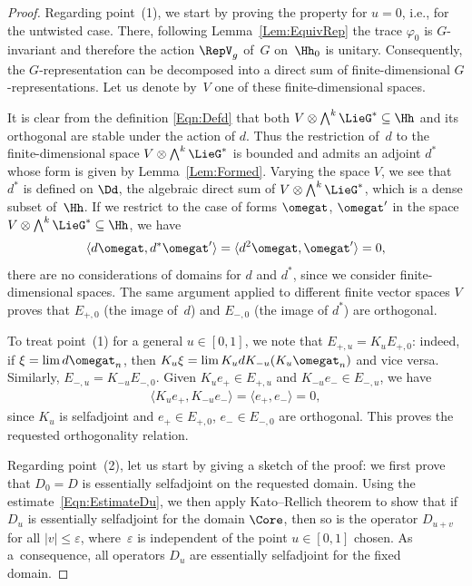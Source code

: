 \begin{proof}
Regarding point~(1), %
we start by proving the property for $u = 0$, i.e., for the untwisted case. There, following Lemma~\ref{Lem:EquivRep} the trace $\varphi_0$ is $G$-invariant and therefore the action $\RepV_g$ of~$G$ on~$\Hh_0$ is unitary. Consequently, the $G$-representation can be decomposed into a direct sum of f\/inite-dimensional $G$-representations. Let us denote by~$V$ one of these f\/inite-dimensional spaces.

It is clear from the def\/inition \eqref{Eqn:Defd} that both $V \otimes \bigwedge^k \LieG^* \subseteq \Hh$ and its orthogonal are stable under the action of $d$. Thus the restriction of~$d$ to the f\/inite-dimensional space $V \otimes \bigwedge^k \LieG^*$ is bounded and admits an adjoint $d^*$ whose form is given by Lemma~\ref{Lem:Formed}. Varying the space $V$, we see that $d^*$ is def\/ined on $\Dd$, the algebraic direct sum of $V \otimes \bigwedge^k \LieG^*$, which is a dense subset of~$\Hh$. If we restrict to the case of forms $\omegat$, $\omegat'$ in the space $V \otimes \bigwedge^k \LieG^* \subseteq \Hh$, we have
\begin{gather*}
\langle d \omegat, d^* \omegat' \rangle = \langle d^2 \omegat, \omegat' \rangle = 0,
\end{gather*}
there are no considerations of domains for $d$ and $d^*$, since we consider f\/inite-dimensional spaces. The same argument applied to dif\/ferent f\/inite vector spaces $V$ proves that $E_{+,0}$ (the image of~$d$) and $E_{-,0}$ (the image of $d^*$) are orthogonal.

To treat point~(1) %
for a general $u \in [0,1]$, we note that $E_{+,u} = K_u E_{+,0}$: indeed, if $\xi = \lim d \omegat_n$, then $K_u \xi = \lim K_u d K_{-u} (K_u \omegat_n)$ and vice versa. Similarly, $E_{-,u} = K_{-u} E_{-,0}$. Given $K_u e_+ \in E_{+,u}$ and $K_{-u} e_- \in E_{-,u}$, we have
\begin{gather*}
\langle K_u e_+, K_{-u} e_- \rangle = \langle e_+, e_- \rangle = 0,
\end{gather*}
since $K_u$ is selfadjoint and $e_+ \in E_{+,0}$, $e_- \in E_{-,0}$ are orthogonal. This proves the requested orthogonality relation.

Regarding point~(2), %
let us start by giving a sketch of the proof: we f\/irst prove that $D_0 = D$ is essentially selfadjoint on the requested domain. Using the estimate~\eqref{Eqn:EstimateDu}, we then apply Kato--Rellich theorem to show that if $D_{u}$ is essentially selfadjoint for the domain $\Core$, then so is the operator $D_{u + v}$ for all $|v| \leqslant \varepsilon$, where~$\varepsilon$ is independent of the point $u \in [0,1]$ chosen. As a~consequence, all operators $D_u$ are essentially selfadjoint for the f\/ixed domain.


\end{proof}
